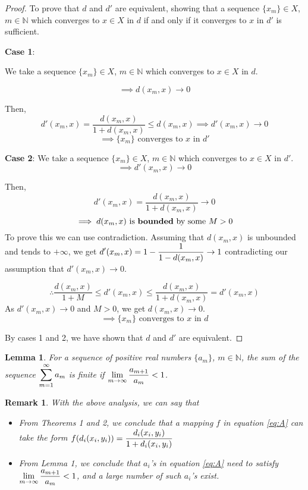 \documentclass[12pt]{article}
\let\bold\textbf
\newtheorem{lemma}{Lemma}[section]
\newtheorem{remark}{Remark}[section]
\begin{document}
\begin{proof}
    To prove that $d$ and $d'$ are equivalent, showing that a sequence $\{x_m\} \in X$, $m\in\mathbb{N}$ which converges to $x \in X$ in $d$ if and only if it converges to $x$ in $d'$ is sufficient.
    
    \bold{Case 1}: 

    We take a sequence $\{x_m\} \in X$, $m\in\mathbb{N}$ which converges to $x \in X$ in $d$.

    $$\implies d(x_m, x) \to 0$$

    Then, 
    $$
    d'(x_m, x) = \frac{d(x_m, x)}{1+d(x_m, x)} \le d(x_m, x) \implies d'(x_m, x) \to 0
    $$
    $$
    \implies \{x_m\} \text{ converges to } x \text{ in } d'
    $$

    \bold{Case 2}:
    We take a sequence $\{x_m\} \in X$, $m\in\mathbb{N}$ which converges to $x \in X$ in $d'$.
    $$\implies d'(x_m, x) \to 0$$

    Then,
    $$
    d'(x_m, x) = \frac{d(x_m, x)}{1+d(x_m, x)} \to 0
    $$
    $$
    \implies d(x_m, x) \text{ is \bold{bounded} by some } M > 0
    $$
    To prove this we can use contradiction. Assuming that $d(x_m, x)$ is unbounded and tends to $+\infty$, we get $\mathlarger{d'(x_m, x) = 1 - \frac{1}{1-d(x_m, x)} \to 1}$ contradicting our assumption that $d'(x_m, x) \to 0$.

    $$
    \therefore \frac{d(x_m, x)}{1+M} \le d'(x_m, x) \le \frac{d(x_m, x)}{1+d(x_m, x)} = d'(x_m, x)
    $$
    As $d'(x_m, x) \to 0$ and $M > 0$, we get $d(x_m, x) \to 0$.
    $$
    \implies \{x_m\} \text{ converges to } x \text{ in } d
    $$

    By cases 1 and 2, we have shown that $d$ and $d'$ are equivalent.
\end{proof}
\vspace{0.4cm}
\begin{lemma}
    For a sequence of positive real numbers $\{a_m\}$, $m \in \mathbb{N}$, the sum of the sequence $\mathlarger{\sum_{m=1}^{\infty} a_m}$ is finite if $\mathlarger{\lim_{m \to \infty} \frac{a_{m+1}}{a_m} < 1}$.
\end{lemma}
\vspace{0.4cm}
\begin{remark}
\label{remark1}
With the above analysis, we can say that 
    \begin{itemize}
        \item From Theorems 1 and 2, we conclude that a mapping $f$ in equation \ref{eq:A} can take the form $\mathlarger{f(d_i(x_i, y_i)) = \frac{d_i(x_i, y_i)}{1+d_i(x_i, y_i)}}$
        \item From Lemma 1, we conclude that $a_i$'s in equation \ref{eq:A} need to satisfy $\mathlarger{\lim_{m \to \infty} \frac{a_{m+1}}{a_m} < 1}$, and a large number of such $a_i$'s exist.
    \end{itemize}
\end{remark}
\end{document}
